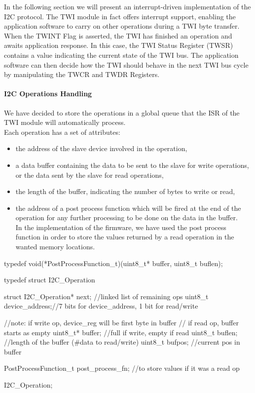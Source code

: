 In the following section we will present an interrupt-driven implementation of the I2C protocol. The TWI module in fact offers interrupt support, enabling the application software to carry on other operations during a TWI byte transfer.\\

When the TWINT Flag is asserted, the TWI has finished an operation and awaits application response. In this case, the TWI Status Register (TWSR) contains a value indicating the current state of the TWI bus. The application software can then decide how the TWI should behave in the next TWI bus cycle by manipulating the TWCR and TWDR Registers\supercite{mega2560_datasheet}.

\paragraph{I2C Operations Handling}
We have decided to store the operations in a global queue that the ISR of the TWI module will automatically process.\\
Each operation has a set of attributes:
\begin{itemize}
	\item the address of the slave device involved in the operation,
	\item a data buffer containing the data to be sent to the slave for write operations, or the data sent by the slave for read operations,
	\item the length of the buffer, indicating the number of bytes to write or read,
	\item the address of a post process function which will be fired at the end of the operation for any further processing to be done on the data in the buffer.\\In the implementation of the firmware, we have used the post process function in order to store the values returned by a read operation in the wanted memory locations.
\end{itemize}
\begin{ccode}
	typedef void(*PostProcessFunction_t)(uint8_t* buffer, uint8_t buflen);

	typedef struct I2C_Operation {
		struct I2C_Operation* next;	//linked list of remaining ops
		uint8_t device_address;//7 bits for device_address, 1 bit for read/write
	
		//note: if write op, device_reg will be first byte in buffer
			// if read op, buffer starts as empty
		uint8_t* buffer;	//full if write, empty if read
		uint8_t buflen;		//length of the buffer (#data to read/write)
		uint8_t bufpos;		//current pos in buffer
	
		PostProcessFunction_t post_process_fn; //to store values if it was a read op
	} I2C_Operation;
\end{ccode}

